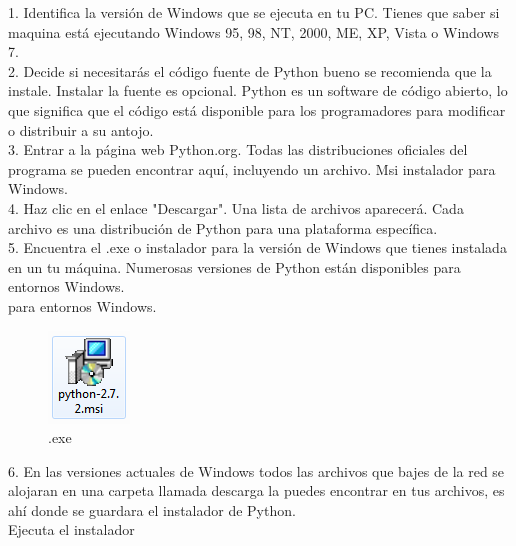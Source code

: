 \documentclass[11pt]{article} %
\begin{document}
1.	Identifica la versión de Windows que se ejecuta en tu PC. Tienes que saber  si maquina está ejecutando Windows 95, 98, NT, 2000, ME, XP, Vista o Windows 7.\\

2.	Decide si necesitarás el código fuente de Python bueno se recomienda que la instale. Instalar la fuente es opcional. Python es un software de código abierto, lo que significa que el código está disponible para los programadores para modificar o distribuir a su antojo.\\

3.	Entrar a la página web Python.org. Todas las distribuciones oficiales del programa se pueden encontrar aquí, incluyendo un archivo. Msi instalador para Windows.\\

4.	Haz clic en el enlace "Descargar". Una lista de archivos aparecerá. Cada archivo es una distribución de Python para una plataforma específica.\\

5.	Encuentra el .exe o instalador para la versión de Windows que tienes instalada en un tu máquina.  Numerosas versiones de Python están disponibles para entornos Windows.\\
para entornos Windows.\\

\begin{figure}[htbp]
\begin{center}
\includegraphics[width=.10\textwidth]{./imagenes/ide.png}
\caption{.exe}
\label{qt}
\end{center}
\end{figure}


6.	En las versiones actuales de Windows todos las archivos que bajes de la red se alojaran en una carpeta llamada descarga la puedes encontrar en tus archivos, es ahí donde se guardara el instalador de Python.\\  

Ejecuta el instalador\\
\end{document}
